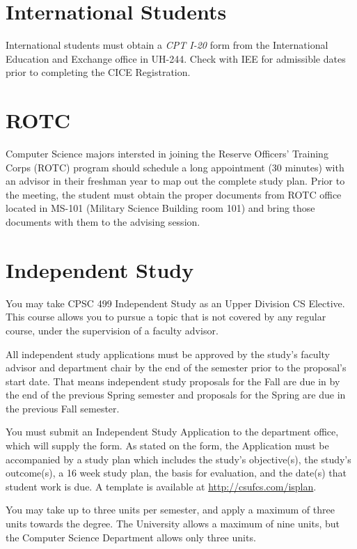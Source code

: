 \documentclass{book}
\newcommand{\shrunkurl}[1]{\url{http://csufcs.com/#1}}
\begin{document}
\section{International Students}

International students must obtain a \emph{CPT I-20} form from the
International Education and Exchange office in UH-244. Check with IEE
for admissible dates prior to completing the CICE Registration.

\section{ROTC}

Computer Science majors intersted in joining the Reserve Officers' Training
Corps (ROTC) program should schedule a long appointment (30 minutes) with an
advisor in their freshman year to map out the complete study plan.  Prior to
the meeting, the student must obtain the proper documents from ROTC office
located in MS-101 (Military Science Building room 101) and bring those
documents with them to the advising session.

\section{Independent Study}

You may take CPSC 499 Independent Study as an Upper Division CS
Elective. This course allows you to pursue a topic that is not covered
by any regular course, under the supervision of a faculty advisor.

All independent study applications must be approved by the study's
faculty advisor and department chair by the end of the semester prior
to the proposal’s start date. That means independent study proposals
for the Fall are due in by the end of the previous Spring semester and
proposals for the Spring are due in the previous Fall semester.

You must submit an Independent Study Application to the department
office, which will supply the form. As stated on the form, the
Application must be accompanied by a study plan which includes the
study's objective(s), the study's outcome(s), a 16 week study plan,
the basis for evaluation, and the date(s) that student work is due. A
template is available at \shrunkurl{isplan}.

You may take up to three units per semester, and apply a maximum of
three units towards the degree. The University allows a maximum of
nine units, but the Computer Science Department allows only three
units.
\end{document}
